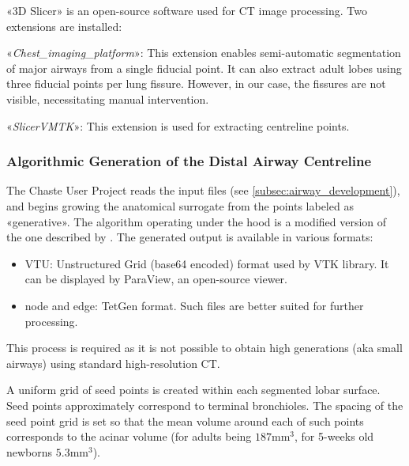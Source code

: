 «3D Slicer» is an open-source software used for CT image processing.
Two extensions are installed:

\begin{description}
\item «\emph{Chest\_imaging\_platform}»: This extension enables
  semi-automatic segmentation of major airways from a single fiducial
  point.  It can also extract adult lobes using three fiducial points
  per lung fissure. However, in our case, the fissures are not
  visible, necessitating manual intervention.
\item «\emph{SlicerVMTK}»: This extension is used for extracting
  centreline points.
\end{description}

\subsubsection{Algorithmic Generation of the Distal Airway Centreline}
\label{subsubsec:statistical_generation}

The Chaste User Project reads the input files (see
\cref{subsec:airway_development}), and begins growing the anatomical
surrogate from the points labeled as «generative».  The algorithm
operating under the hood is a modified version\cite{bordas2015} of the
one described by \textcite{tawhai2000}.  The generated output is
available in various formats:

\begin{itemize}
\item VTU: Unstructured Grid (base64 encoded) format used by VTK
  library.  It can be displayed by ParaView, an open-source viewer.
\item node and edge: TetGen format.  Such files are better suited for
  further processing.
\end{itemize}


This process is required as it is not possible to obtain high
generations (aka small airways) using standard high-resolution
CT\cite{bordas2015}.

A uniform grid of seed points is created within each segmented lobar
surface. Seed points approximately correspond to terminal bronchioles.
The spacing of the seed point grid is set so that the mean volume around
each of such points corresponds to the acinar volume (for adults being
$187\text{mm}^3$, for 5-weeks old newborns $5.3\text{mm}^3$).

